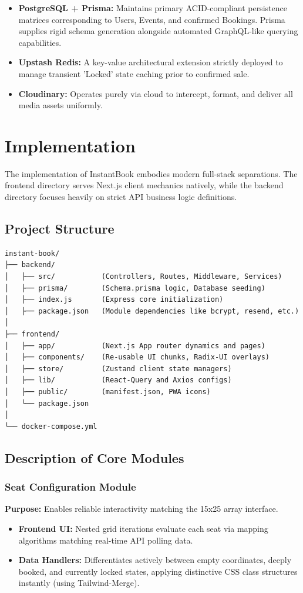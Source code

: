 \documentclass[12pt,a4paper]{report}
\begin{document}
\begin{itemize}
    \item \textbf{PostgreSQL + Prisma:} Maintains primary ACID-compliant persistence matrices corresponding to Users, Events, and confirmed Bookings. Prisma supplies rigid schema generation alongside automated GraphQL-like querying capabilities.
    \item \textbf{Upstash Redis:} A key-value architectural extension strictly deployed to manage transient 'Locked' state caching prior to confirmed sale.
    \item \textbf{Cloudinary:} Operates purely via cloud to intercept, format, and deliver all media assets uniformly.
\end{itemize}

\chapter{Implementation}

The implementation of InstantBook embodies modern full-stack separations. The frontend directory serves Next.js client mechanics natively, while the backend directory focuses heavily on strict API business logic definitions.

\section{Project Structure}

\begin{verbatim}
instant-book/
├── backend/
│   ├── src/           (Controllers, Routes, Middleware, Services)
│   ├── prisma/        (Schema.prisma logic, Database seeding)
│   ├── index.js       (Express core initialization)
│   ├── package.json   (Module dependencies like bcrypt, resend, etc.)
│
├── frontend/
│   ├── app/           (Next.js App router dynamics and pages)
│   ├── components/    (Re-usable UI chunks, Radix-UI overlays)
│   ├── store/         (Zustand client state managers)
│   ├── lib/           (React-Query and Axios configs)
│   ├── public/        (manifest.json, PWA icons)
│   └── package.json
│
└── docker-compose.yml
\end{verbatim}

\section{Description of Core Modules}

\subsection{Seat Configuration Module}
\textbf{Purpose:} Enables reliable interactivity matching the 15x25 array interface.
\begin{itemize}
    \item \textbf{Frontend UI:} Nested grid iterations evaluate each seat via mapping algorithms matching real-time API polling data.
    \item \textbf{Data Handlers:} Differentiates actively between empty coordinates, deeply booked, and currently locked states, applying distinctive CSS class structures instantly (using Tailwind-Merge).
\end{itemize}
\end{document}
